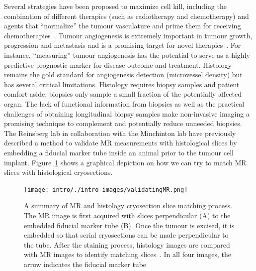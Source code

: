 Several strategies have been proposed to maximize cell kill, including the combination of different therapies (such as radiotherapy and chemotherapy) and agents that ``normalize'' the tumour vasculature and prime them for receiving chemotherapies~\cite{Jain:2005uv}.
Tumour angiogenesis is extremely important in tumour growth, progression and metastasis and is a promising target for novel therapies~\cite{Miles:2000wq}.
For instance, ``measuring'' tumour angiogenesis has the potential to serve as a highly predictive prognostic marker for disease outcome and treatment.
Histology remains the gold standard for angiogenesis detection (microvessel density) but has several critical limitations.
Histology requires biopsy samples and patient comfort aside, biopsies only sample a small fraction of the potentially affected organ.
The lack of functional information from biopsies as well as the practical challenges of obtaining longitudinal biopsy samples make non-invasive imaging a promising technique to complement and potentially reduce unneeded biopsies.
The Reinsberg lab in collaboration with the Minchinton lab have previously described a method to validate MR measurements with histological slices by embedding a fiducial marker tube inside an animal prior to the tumour cell implant. 
Figure~\ref{validatingMR} shows a graphical depiction on how  we can try to match MR slices with histological cryosections. 

\begin{figure}[htbp]  
 \begin{center}  
 \texttt{[image: intro/./intro-images/validatingMR.png]}  
 \caption{A summary of MR and histology cryosection slice matching process.
 The MR image is first acquired with slices perpendicular (A) to the embedded fiducial marker tube (B).
 Once the tumour is excised, it is embedded so that serial cryosections can be made perpendicular to the tube.
 After the staining process, histology images are compared with MR images to identify matching slices~\cite{Bains:2009ws}.
 In all four images, the arrow indicates the fiducial marker tube}  
 \label{validatingMR}
 \end{center} 
\end{figure} 


